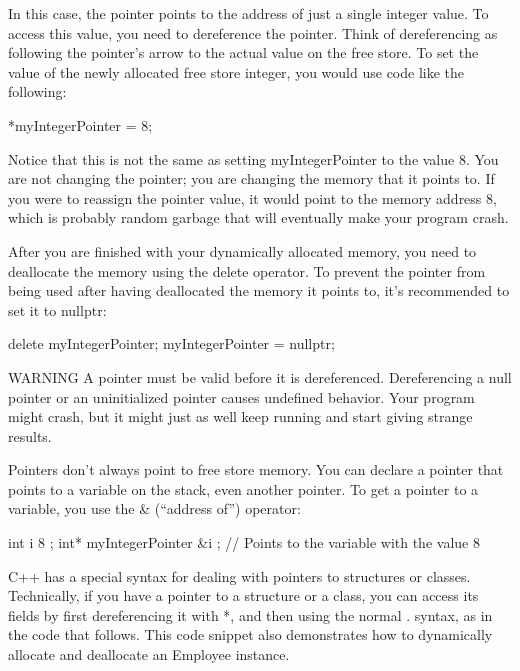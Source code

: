 In this case, the pointer points to the address of just a single integer value. To access this value, you need to dereference the pointer. Think of dereferencing as following the pointer’s arrow to the actual value on the free store. To set the value of the newly allocated free store integer, you would use code like the following:

\begin{cpp}
*myIntegerPointer = 8;
\end{cpp}

Notice that this is not the same as setting myIntegerPointer to the value 8. You are not changing the pointer; you are changing the memory that it points to. If you were to reassign the pointer value, it would point to the memory address 8, which is probably random garbage that will eventually make your program crash.

After you are finished with your dynamically allocated memory, you need to deallocate the memory using the delete operator. To prevent the pointer from being used after having deallocated the memory it points to, it’s recommended to set it to nullptr:

\begin{cpp}
delete myIntegerPointer;
myIntegerPointer = nullptr;
\end{cpp}

\begin{myWarning}{WARNING}
A pointer must be valid before it is dereferenced. Dereferencing a null pointer or an uninitialized pointer causes undefined behavior. Your program might crash, but it might just as well keep running and start giving strange results.
\end{myWarning}

Pointers don’t always point to free store memory. You can declare a pointer that points to a variable on the stack, even another pointer. To get a pointer to a variable, you use the \& (“address of”) operator:

\begin{cpp}
int i { 8 };
int* myIntegerPointer { &i }; // Points to the variable with the value 8
\end{cpp}

C++ has a special syntax for dealing with pointers to structures or classes. Technically, if you have a pointer to a structure or a class, you can access its fields by first dereferencing it with *, and then using the normal . syntax, as in the code that follows. This code snippet also demonstrates how to dynamically allocate and deallocate an Employee instance.

